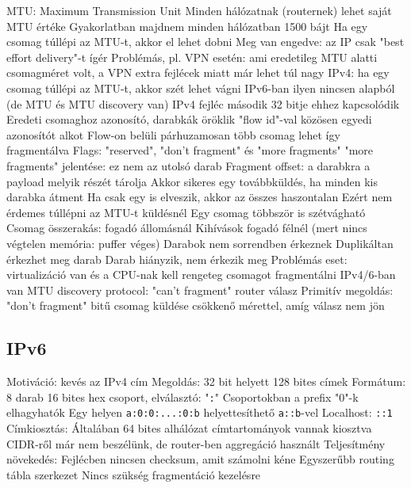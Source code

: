 \documentclass[12pt,a4paper]{article}
\begin{document}
\begin{outline}
	\1 MTU: Maximum Transmission Unit
		\2 Minden hálózatnak (routernek) lehet saját MTU értéke
		\2 Gyakorlatban majdnem minden hálózatban 1500 bájt
	\1 Ha egy csomag túllépi az MTU-t, akkor el lehet dobni
		\2 Meg van engedve: az IP csak "best effort delivery"-t ígér
		\2 Problémás, pl. VPN esetén: ami eredetileg MTU alatti csomagméret volt, a VPN extra fejlécek miatt már lehet túl nagy
	\1 IPv4: ha egy csomag túllépi az MTU-t, akkor szét lehet vágni
		\2 IPv6-ban ilyen nincsen alapból (de MTU és MTU discovery van)
		\2 IPv4 fejléc második 32 bitje ehhez kapcsolódik
			\2 Eredeti csomaghoz azonosító, darabkák öröklik
				\3 "flow id"-val közösen egyedi azonosítót alkot
				\3 Flow-on belüli párhuzamosan több csomag lehet így fragmentálva
			\2 Flags: "reserved", "don't fragment" és "more fragments"
				\3 "more fragments" jelentése: ez nem az utolsó darab
			\2 Fragment offset: a darabkra a payload melyik részét tárolja
		\2 Akkor sikeres egy továbbküldés, ha minden kis darabka átment
			\3 Ha csak egy is elveszik, akkor az összes haszontalan
			\3 Ezért nem érdemes túllépni az MTU-t küldésnél
		\2 Egy csomag többször is szétvágható
		\2 Csomag összerakás: fogadó állomásnál
		\2 Kihívások fogadó félnél (mert nincs végtelen memória: puffer véges)
			\3 Darabok nem sorrendben érkeznek
			\3 Duplikáltan érkezhet meg darab
			\3 Darab hiányzik, nem érkezik meg
		\2 Problémás eset: virtualizáció van és a CPU-nak kell rengeteg csomagot fragmentálni
	\1 IPv4/6-ban van MTU discovery protocol: "can't fragment" router válasz
		\2 Primitív megoldás: "don't fragment" bitű csomag küldése csökkenő mérettel, amíg válasz nem jön
\end{outline}

\pagebreak

\subsection{IPv6}

\begin{outline}
	\1 Motiváció: kevés az IPv4 cím
	\1 Megoldás: 32 bit helyett 128 bites címek
		\2 Formátum: 8 darab 16 bites hex csoport, elválasztó: "\texttt{:}"
		\2 Csoportokban a prefix "0"-k elhagyhatók
		\2 Egy helyen \texttt{a:0:0:...:0:b} helyettesíthető \texttt{a::b}-vel
	\1 Localhost: \texttt{::1}
	\1 Címkiosztás:
		\2 Általában 64 bites alhálózat címtartományok vannak kiosztva
		\2 CIDR-ről már nem beszélünk, de router-ben aggregáció használt
	\1 Teljesítmény növekedés:
		\2 Fejlécben nincsen checksum, amit számolni kéne
		\2 Egyszerűbb routing tábla szerkezet
		\2 Nincs szükség fragmentáció kezelésre
\end{outline}
\end{document}
